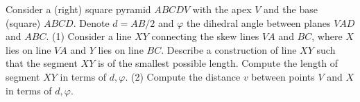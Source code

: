 Consider a (right) square pyramid $ABCDV$ with the apex $V$ and the base (square) $ABCD$. Denote $d=AB/2$ and $\varphi$ the dihedral angle between planes $VAD$ and $ABC$.
(1) Consider a line $XY$ connecting the skew lines $VA$ and $BC$, where $X$ lies on line $VA$ and $Y$ lies on line $BC$. Describe a construction of line $XY$ such that the segment $XY$ is of the smallest possible length. Compute the length of segment $XY$ in terms of $d,\varphi$.
(2) Compute the distance $v$ between points $V$ and $X$ in terms of $d,\varphi.$